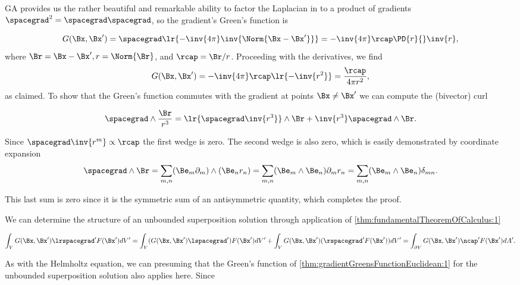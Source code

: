 GA provides us the rather beautiful and remarkable ability to factor the Laplacian in to a product of gradients \( \spacegrad^2 = \spacegrad \spacegrad \), so the gradient's Green's function is

\begin{dmath}\label{eqn:greensFunctionGradient:580}
G(\Bx, \Bx')
= \spacegrad \lr{ -\inv{4\pi} \inv{ \Norm{\Bx - \Bx'} } }
= -\inv{4\pi} \rcap \PD{r}{} \inv{r},
\end{dmath}
where \( \Br = \Bx - \Bx', r = \Norm{\Br} \), and \( \rcap = \Br/r \).  Proceeding with the derivatives, we find
\begin{dmath}\label{eqn:greensFunctionGradient:600}
G(\Bx, \Bx')
= -\inv{4\pi} \rcap \lr{ -\inv{r^2} }
= \frac{\rcap}{4 \pi r^2},
\end{dmath}
as claimed.  To show that the Green's function commutes with the gradient at points \( \Bx \ne \Bx' \) we can compute the (bivector) curl

\begin{dmath}\label{eqn:greensFunctionGradient:620}
\spacegrad \wedge \frac{\Br}{r^3}
=
\lr{ \spacegrad \inv{r^3}} \wedge \Br
+
\inv{r^3} \spacegrad \wedge \Br.
\end{dmath}

Since \( \spacegrad \inv{r^m} \propto \rcap \) the first wedge is zero.  The second wedge is also zero, which is easily demonstrated by coordinate expansion
\begin{dmath}\label{eqn:greensFunctionGradient:640}
\spacegrad \wedge \Br
=
\sum_{m,n} (\Be_m \partial_m) \wedge (\Be_n r_n)
=
\sum_{m,n} (\Be_m \wedge \Be_n) \partial_m r_n
=
\sum_{m,n} (\Be_m \wedge \Be_n) \delta_{m n}.
\end{dmath}

This last sum is zero since it is the symmetric sum of an antisymmetric quantity, which completes the proof.

We can determine the structure of an unbounded superposition solution through application of
\cref{thm:fundamentalTheoremOfCalculus:1}

\begin{dmath}\label{eqn:greensFunctionGradient:500}
\int_V G(\Bx, \Bx') \lrspacegrad' F(\Bx') dV'
=
\int_V (G(\Bx, \Bx') \lspacegrad') F(\Bx') dV'
+
\int_V G(\Bx, \Bx') (\rspacegrad' F(\Bx')) dV'
=
\int_{\partial V} G(\Bx, \Bx') \ncap' F(\Bx') dA'.
\end{dmath}

As with the Helmholtz equation, we can presuming that the Green's function of
\cref{thm:gradientGreensFunctionEuclidean:1}
for the unbounded superposition solution also applies here.  Since

